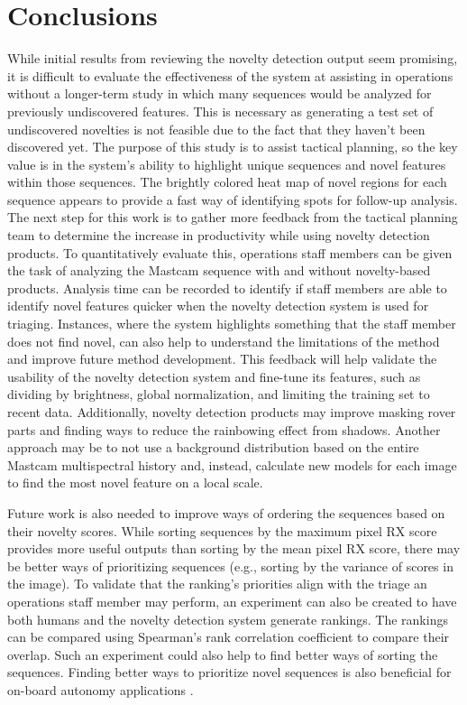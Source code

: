 \section{Conclusions}
While initial results from reviewing the novelty detection output seem promising, it is difficult to evaluate the effectiveness of the system at assisting in operations without a longer-term study in which many sequences would be analyzed for previously undiscovered features.
This is necessary as generating a test set of undiscovered novelties is not feasible due to the fact that they haven't been discovered yet.
The purpose of this study is to assist tactical planning, so the key value is in the system's ability to highlight unique sequences and novel features within those sequences. 
The brightly colored heat map of novel regions for each sequence appears to provide a fast way of identifying spots for follow-up analysis. 
The next step for this work is to gather more feedback from the tactical planning team to determine the increase in productivity while using novelty detection products.
To quantitatively evaluate this, operations staff members can be given the task of analyzing the Mastcam sequence with and without novelty-based products.
Analysis time can be recorded to identify if staff members are able to identify novel features quicker when the novelty detection system is used for triaging.
Instances, where the system highlights something that the staff member does not find novel, can also help to understand the limitations of the method and improve future method development.
This feedback will help validate the usability of the novelty detection system and fine-tune its features, such as dividing by brightness, global normalization, and limiting the training set to recent data. 
Additionally, novelty detection products may improve masking rover parts and finding ways to reduce the rainbowing effect from shadows.
Another approach may be to not use a background distribution based on the entire Mastcam multispectral history and, instead, calculate new models for each image to find the most novel feature on a local scale.

Future work is also needed to improve ways of ordering the sequences based on their novelty scores.
While sorting sequences by the maximum pixel RX score provides more useful outputs than sorting by the mean pixel RX score, there may be better ways of prioritizing sequences (e.g., sorting by the variance of scores in the image). %
To validate that the ranking's priorities align with the triage an operations staff member may perform, an experiment can also be created to have both humans and the novelty detection system generate rankings.
The rankings can be compared using Spearman's rank correlation coefficient to compare their overlap.
Such an experiment could also help to find better ways of sorting the sequences.
Finding better ways to prioritize novel sequences is also beneficial for on-board autonomy applications \cite{wagstaffnovelty}.

